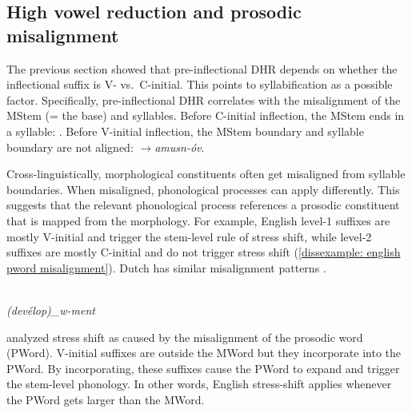 \subsection{High vowel reduction and prosodic misalignment }\label{disssection: reduction: destressed reduction EA: pword and feet}

The previous section showed that   pre-inflectional   DHR depends on  whether the inflectional suffix is V- vs.\ C-initial. This points to syllabification as a possible factor.   Specifically, pre-inflectional  DHR correlates with the misalignment of the MStem (= the base) and syllables. Before C-initial inflection, the MStem ends in a syllable: \textit{}. Before V-initial inflection, the MStem boundary and syllable boundary are not aligned: \textit{$\rightarrow$amusn-\'ov}. 


Cross-linguistically, morphological constituents often get misaligned from syllable boundaries. When misaligned, phonological processes  can apply differently. This suggests that the relevant phonological process references a prosodic constituent that is mapped from the morphology. For example,  English level-1 suffixes are mostly V-initial and  trigger the stem-level rule of stress shift, while level-2 suffixes are mostly  C-initial and do not trigger stress shift (\ref{dissexample: english pword misalignment}). Dutch has similar misalignment patterns \citep{Oostendorp-2004-CrossingMorphemeBoundariesDutch}.






\begin{exe}
	
	
	\ex {}\label{dissexample: english pword misalignment} \\
	\textit{(dev\'elop)_w-ment}
	
	
\end{exe} 


\cite{Raffelsiefen-1999-PhonoConstraintEnglishWords,Raffelsiefen-2005-ParadigmvsBoundary} analyzed stress shift as caused by the misalignment of the prosodic word (PWord). V-initial suffixes  are outside the MWord but they incorporate into the PWord. By incorporating, these suffixes cause the PWord to expand and trigger the stem-level phonology. In other words, English stress-shift applies whenever the PWord gets larger than the MWord. 

